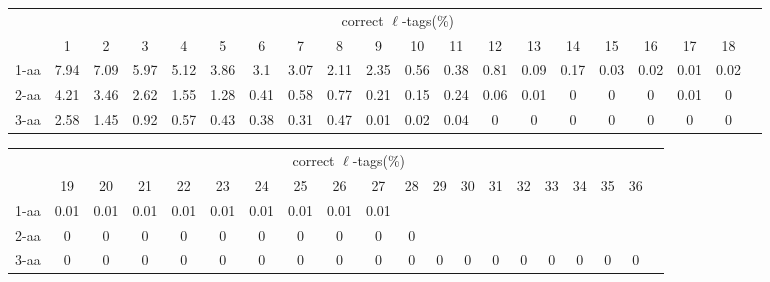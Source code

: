 \documentclass{article}[12pt]
\begin{document}
\begin{landscape}

\begin{table}[h]\tiny
\vspace{3mm}
{\centering
\begin{center}
\begin{tabular}{|l|c|c|c|c|c|c|c|c|c|c|c|c|c|c|c|c|c|c|c|}
  \hline
  & \multicolumn{ 18 }{|c|}{correct $\ell$-tags(\%)} \\
  \cline{2- 19}
    & 1 & 2 & 3 & 4 & 5 & 6 & 7 & 8 & 9 & 10 & 11 & 12 & 13 & 14 & 15 & 16 & 17 & 18\\
  \hline
1-aa  & 7.94 & 7.09 & 5.97 & 5.12 & 3.86 & 3.1 & 3.07 & 2.11 & 2.35 & 0.56 & 0.38 & 0.81 & 0.09 & 0.17 & 0.03 & 0.02 & 0.01 & 0.02\\
2-aa  & 4.21 & 3.46 & 2.62 & 1.55 & 1.28 & 0.41 & 0.58 & 0.77 & 0.21 & 0.15 & 0.24 & 0.06 & 0.01 & 0 & 0 & 0 & 0.01 & 0\\
3-aa  & 2.58 & 1.45 & 0.92 & 0.57 & 0.43 & 0.38 & 0.31 & 0.47 & 0.01 & 0.02 & 0.04 & 0 & 0 & 0 & 0 & 0 & 0 & 0\\
 \hline
\end{tabular}
\end{center}
\par}
\centering

\vspace{3mm}
\end{table}
\begin{table}[h]\tiny
\vspace{3mm}
{\centering
\begin{center}
\begin{tabular}{|l|c|c|c|c|c|c|c|c|c|c|c|c|c|c|c|c|c|c|c|}
  \hline
  & \multicolumn{ 18 }{|c|}{correct $\ell$-tags(\%)} \\
  \cline{2- 19}
    & 19 & 20 & 21 & 22 & 23 & 24 & 25 & 26 & 27 & 28 & 29 & 30 & 31 & 32 & 33 & 34 & 35 & 36\\
  \hline
1-aa  & 0.01 & 0.01 & 0.01 & 0.01 & 0.01 & 0.01 & 0.01 & 0.01 & 0.01 &  &  &  &  &  &  &  &  & \\
2-aa  & 0 & 0 & 0 & 0 & 0 & 0 & 0 & 0 & 0 & 0 &  &  &  &  &  &  &  & \\
3-aa  & 0 & 0 & 0 & 0 & 0 & 0 & 0 & 0 & 0 & 0 & 0 & 0 & 0 & 0 & 0 & 0 & 0 & 0\\
 \hline
\end{tabular}
\end{center}
\par}
\centering


\end{table}
\end{landscape}
\end{document}
